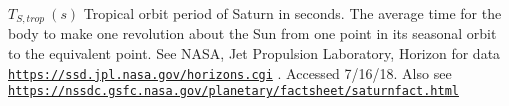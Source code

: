$ T_{S,trop} \ (s)$ Tropical orbit period of Saturn in seconds. The average time for the body to make one revolution about the Sun from one point in its seasonal orbit to the equivalent point. See N\+A\+SA, Jet Propulsion Laboratory, Horizon for data \href{https://ssd.jpl.nasa.gov/horizons.cgi}{\tt https\+://ssd.\+jpl.\+nasa.\+gov/horizons.\+cgi} . Accessed 7/16/18. Also see \href{https://nssdc.gsfc.nasa.gov/planetary/factsheet/saturnfact.html}{\tt https\+://nssdc.\+gsfc.\+nasa.\+gov/planetary/factsheet/saturnfact.\+html} 